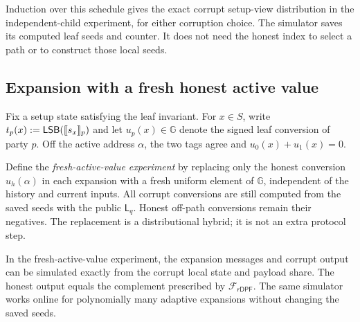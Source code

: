 Induction over this schedule gives the exact corrupt setup-view distribution
in the independent-child experiment, for either corruption choice. The
simulator saves its computed leaf seeds and counter. It does not need the
honest index to select a path or to construct those local seeds.

\subsection{Expansion with a fresh honest active value}

Fix a setup state satisfying the leaf invariant. For $x\in S$, write
$t_p(x):=\lsb(\share{s_x}_p)$ and let $u_p(x)\in\mathbb G$ denote the signed
leaf conversion of party $p$. Off the active address $\alpha$, the two tags
agree and $u_0(x)+u_1(x)=0$.

Define the \emph{fresh-active-value experiment} by replacing only the honest
conversion $u_h(\alpha)$ in each expansion with a fresh uniform element of
$\mathbb G$, independent of the history and current inputs. All corrupt
conversions are still computed from the saved seeds with the public
$\mathsf L_q$. Honest off-path conversions remain their negatives. The
replacement is a distributional hybrid; it is not an extra protocol step.

\begin{lemma}
\label{lem:dpf-leaf-update-simulation}
In the fresh-active-value experiment, the expansion messages and corrupt
output can be simulated exactly from the corrupt local state and payload
share. The honest output equals the complement prescribed by
$\mathcal F_{\mathsf{rDPF}}$. The same simulator works online for
polynomially many adaptive expansions without changing the saved seeds.
\end{lemma}

